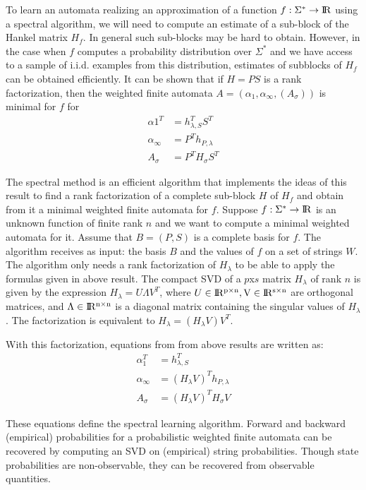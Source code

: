\documentclass[letterpaper]{article}
\begin{document}
To learn an automata realizing an approximation of a function $f : \Sigma^{*} \rightarrow \rm I\!R$ using a spectral algorithm, we will need to compute an estimate of
a sub-block of the Hankel matrix $H_{f}$. In general such sub-blocks may be hard to
obtain. However, in the case when $f$ computes a probability distribution over $\Sigma^{*}$ and we have access to a sample of i.i.d. examples from this distribution, estimates of subblocks of $H_{f}$ can be obtained efficiently. It can be shown that if $H = PS$ is a rank factorization, then the weighted finite automata $A = (\alpha_{1}, \alpha_{\infty}, (A_{\sigma}))$ is minimal for $f$ for 
\begin{align*}				
	\alpha{1}^{T}   & = h_{\lambda, S}^{T}S^{T} \\		
	\alpha_{\infty} & = P^{T}h_{P,\lambda}      \\				
	A_{\sigma}      & = P^{T}H_{\sigma}S^{T}    
\end{align*}

The spectral method is an efficient algorithm that implements the ideas of this result to find a rank factorization of a complete sub-block $H$ of $H_{f}$ and obtain from it a minimal weighted finite automata for $f$. Suppose $f : \Sigma^{*} \rightarrow \rm I\!R$ is an unknown function of finite rank $n$ and we want to compute a minimal weighted automata for it. Assume that $B = (P, S)$ is a complete basis for $f$. The algorithm receives as input: the basis $B$ and the values of $f$ on a set of strings $W$. The algorithm only needs a rank factorization of $H_{λ}$ to be able to apply the formulas given in above result. The compact SVD of a $p$x$s$ matrix $H_{\lambda}$ of rank $n$ is given by the expression $H_{\lambda} = U\Lambda V^{T}$, where $U \in \rm I\!R^{p\times n}, V \in \rm I\!R^{s\times n}$ are orthogonal matrices, and $\Lambda \in \rm I\!R^{n\times n}$ is a diagonal matrix containing the singular values of $H_{\lambda}$. The factorization is equivalent to $H_{\lambda} = (H_{\lambda}V)V^{T}$.

With this factorization, equations from from above results are written as:
\begin{align*}
	\alpha_{1}^{T}  & = h^{T}_{\lambda,S}               \\
	\alpha_{\infty} & = (H_{\lambda}V)^{T}h_{P,\lambda} \\		
	A_{\sigma}      & = (H_{\lambda}V)^{T}H_{\sigma}V   
\end{align*}

These equations define the spectral learning algorithm. Forward and backward (empirical) probabilities for a probabilistic weighted finite automata can be recovered by computing an SVD on (empirical) string probabilities. Though state probabilities are non-observable, they can be recovered from observable quantities.
\end{document}
